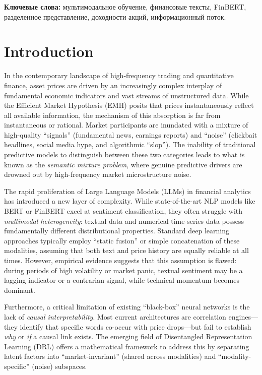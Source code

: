 \documentclass[12pt, a4paper]{article}
\begin{document}
\noindent\textbf{Ключевые слова:} мультимодальное обучение, финансовые тексты, FinBERT, разделенное представление, доходности акций, информационный поток.

\newpage

\tableofcontents
\newpage


\section{Introduction}
\label{sec:intro}

In the contemporary landscape of high-frequency trading and quantitative finance, asset prices are driven by an increasingly complex interplay of fundamental economic indicators and vast streams of unstructured data. While the Efficient Market Hypothesis (EMH) posits that prices instantaneously reflect all available information, the mechanism of this absorption is far from instantaneous or rational. Market participants are inundated with a mixture of high-quality ``signals'' (fundamental news, earnings reports) and ``noise'' (clickbait headlines, social media hype, and algorithmic ``slop''). The inability of traditional predictive models to distinguish between these two categories leads to what is known as the \textit{semantic mixture problem}, where genuine predictive drivers are drowned out by high-frequency market microstructure noise.

The rapid proliferation of Large Language Models (LLMs) in financial analytics has introduced a new layer of complexity. While state-of-the-art NLP models like BERT or FinBERT excel at sentiment classification, they often struggle with \textit{multimodal heterogeneity}: textual data and numerical time-series data possess fundamentally different distributional properties. Standard deep learning approaches typically employ ``static fusion'' or simple concatenation of these modalities, assuming that both text and price history are equally reliable at all times. However, empirical evidence suggests that this assumption is flawed: during periods of high volatility or market panic, textual sentiment may be a lagging indicator or a contrarian signal, while technical momentum becomes dominant.

Furthermore, a critical limitation of existing ``black-box'' neural networks is the lack of \textit{causal interpretability}. Most current architectures are correlation engines---they identify that specific words co-occur with price drops---but fail to establish \textit{why} or \textit{if} a causal link exists. The emerging field of Disentangled Representation Learning (DRL) offers a mathematical framework to address this by separating latent factors into ``market-invariant'' (shared across modalities) and ``modality-specific'' (noise) subspaces.
\end{document}
